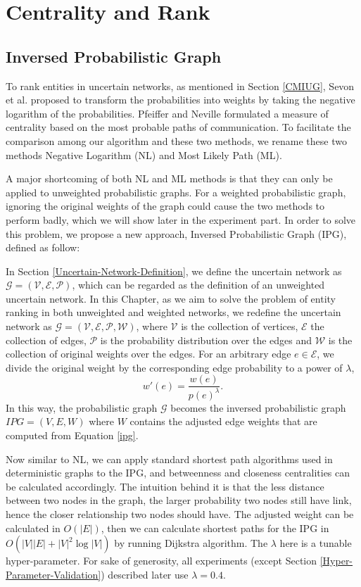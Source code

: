 \documentclass[\main/thesis.tex]{subfiles}
\begin{document}
\chapter{Centrality and Rank}

\section{Inversed Probabilistic Graph} \label{Inversed-Probabilistic-Graph}
To rank entities in uncertain networks, as mentioned in Section \ref{CMIUG}, Sevon et al. \cite{sevon2006link} proposed to transform the probabilities into weights by taking the negative logarithm of the probabilities. Pfeiffer and Neville \cite{pfeiffer2010probabilistic} formulated a measure of centrality based on the most probable paths of communication. To facilitate the comparison among our algorithm and these two methods, we rename these two methods Negative Logarithm (NL) and Most Likely Path (ML).

A major shortcoming of both NL and ML methods is that they can only be applied to unweighted probabilistic graphs. For a weighted probabilistic graph, ignoring the original weights of the graph could cause the two methods to perform badly, which we will show later in the experiment part. In order to solve this problem, we propose a new approach, Inversed Probabilistic Graph (IPG), defined as follow:

In Section \ref{Uncertain-Network-Definition}, we define the uncertain network as $\mathcal{G = (V,E,P)}$, which can be regarded as the definition of an unweighted uncertain network. In this Chapter, as we aim to solve the problem of entity ranking in both unweighted and weighted networks, we redefine the uncertain network as $\mathcal{G = (V,E,P,W)}$, where $\mathcal{V}$ is the collection of vertices, $\mathcal{E}$ the collection of edges, $\mathcal{P}$ is the probability distribution over the edges and $\mathcal{W}$ is the collection of original weights over the edges. For an arbitrary edge $e \in \mathcal{E}$, we divide the original weight by the corresponding edge probability to a power of $\lambda$,
\begin{equation}
w'(e) = \frac{w(e)}{p(e)^\lambda }. \label{ipg}
\end{equation}
In this way, the probabilistic graph $\mathcal{G}$ becomes the inversed probabilistic graph $IPG = (V, E, W)$ where $W$ contains the adjusted edge weights that are computed from Equation \ref{ipg}.

Now similar to NL, we can apply standard shortest path algorithms used in deterministic graphs to the IPG, and betweenness and closeness centralities can be calculated accordingly. The intuition behind it is that the less distance between two nodes in the graph, the larger probability two nodes still have link, hence the closer relationship two nodes should have. The adjusted weight can be calculated in $O(|E|)$, then we can calculate shortest paths for the IPG in $O(|V||E|+|V|^2 \log|V|)$ by running Dijkstra algorithm. The $\lambda$ here is a tunable hyper-parameter. For sake of generosity, all experiments (except Section \ref{Hyper-Parameter-Validation}) described later use $\lambda = 0.4$. 
\end{document}
